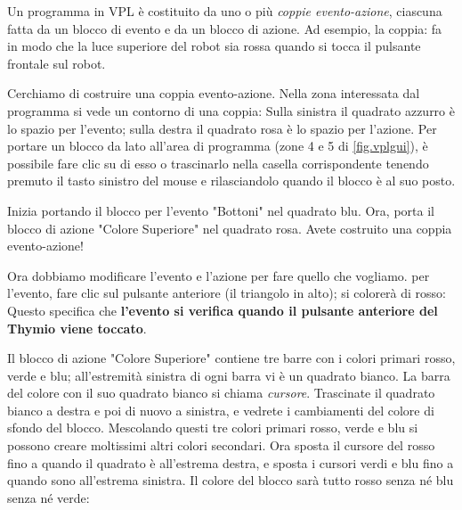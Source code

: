 Un programma in VPL è costituito da uno o più \emph{coppie evento-azione},
ciascuna fatta
da un blocco di evento e da un blocco di azione. Ad esempio, la coppia:
 fa in modo che la luce superiore del robot sia rossa quando si tocca il pulsante frontale sul robot.


Cerchiamo di costruire una coppia evento-azione.
Nella zona interessata dal programma si vede un contorno di una coppia:
Sulla sinistra il quadrato azzurro  è lo spazio per l'evento; sulla destra il quadrato rosa è lo spazio per l'azione. %
Per portare un blocco da lato all'area di programma  (zone 4 e 5 di \cref{fig.vplgui}), è possibile fare clic su di esso o trascinarlo nella casella corrispondente tenendo premuto il tasto sinistro del mouse e rilasciandolo quando il blocco è
al suo posto.

Inizia portando il blocco per l'evento "Bottoni"   nel quadrato blu.
Ora, porta il blocco di azione "Colore Superiore"  nel quadrato rosa.
Avete costruito una coppia evento-azione!

Ora dobbiamo modificare l'evento e l'azione per fare quello che vogliamo. per
l'evento, fare clic sul pulsante anteriore (il triangolo in alto); si colorerà di
rosso: 
Questo specifica che \textbf{l'evento si verifica quando il pulsante anteriore del Thymio viene toccato}.

Il blocco di azione "Colore Superiore" contiene tre barre con i colori primari rosso,
verde e blu; all'estremità sinistra di ogni barra vi è un quadrato bianco. La barra del colore
con il suo quadrato bianco si chiama \emph{cursore}. Trascinate il quadrato bianco
a destra e poi di nuovo a sinistra, e vedrete i cambiamenti del
colore di sfondo del blocco.
Mescolando questi tre colori primari rosso, verde e blu si possono creare moltissimi altri colori secondari.
Ora sposta il cursore del rosso fino a quando il
quadrato è all'estrema destra, e sposta i cursori verdi e blu fino a quando
sono all'estrema sinistra. Il colore del blocco sarà tutto rosso senza né blu senza né
verde: 

